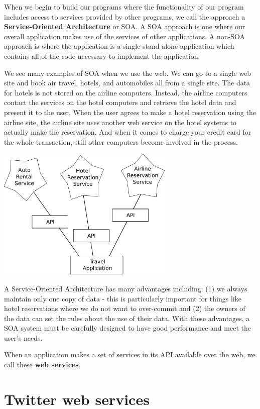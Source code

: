 \documentclass[11pt]{book}
\begin{document}
When we begin to build our programs where the functionality of
our program includes access to services provided by other programs, 
we call the approach a {\bf Service-Oriented Architecture} or SOA.
A SOA approach is one where our overall application makes use of 
the services of other applications.  A non-SOA approach is where the
application is a single stand-alone application which contains all of the
code necessary to implement the application.

We see many examples of SOA when we use the web.  We can go to a single 
web site and book air travel, hotels, and automobiles all from a 
single site.  The data for hotels is not stored on the airline computers. 
Instead, the airline computers contact the services on the hotel computers
and retrieve the hotel data and present it to the user.  When the user
agrees to make a hotel reservation using the airline site, the airline site uses
another web service on the hotel systems to actually make the reservation.
And when it comes to charge your credit card for the whole transaction, 
still other computers become involved in the process.

\beforefig
\centerline{\includegraphics[height=2.50in]{figs2/soa.eps}}
\afterfig

A Service-Oriented Architecture has many advantages including: (1) we 
always maintain only one copy of data - this is particularly important
for things like hotel reservations where we do not want to over-commit
and (2) the owners of the data can set the rules about the use of their 
data.   With these advantages, a SOA system must be carefully designed
to have good performance and meet the user's needs.

When an application makes a set of services in its API available over the web, 
we call these {\bf web services}. 

\section{Twitter web services}
\end{document}
